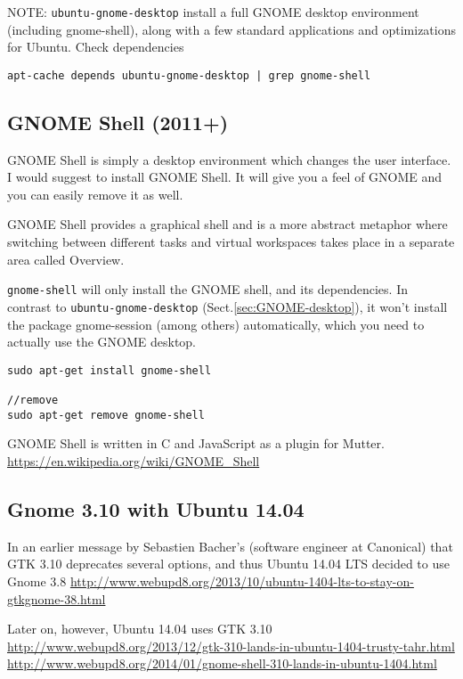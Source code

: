 NOTE: \verb!ubuntu-gnome-desktop! install a full GNOME desktop environment
(including gnome-shell), along with a few standard applications and
optimizations for Ubuntu. Check dependencies
\begin{verbatim}
apt-cache depends ubuntu-gnome-desktop | grep gnome-shell
\end{verbatim}


\subsection{GNOME Shell (2011+)}
\label{sec:GNOME-Shell}

GNOME Shell is simply a desktop environment which changes the user interface.
I would suggest to install GNOME Shell. It will give you a feel of GNOME and you
can easily remove it as well.

GNOME Shell provides a graphical shell and is a more abstract metaphor where
switching between different tasks and virtual workspaces takes place in a
separate area called Overview.

\verb!gnome-shell! will only install the GNOME shell, and its dependencies. In
contrast to \verb!ubuntu-gnome-desktop! (Sect.\ref{sec:GNOME-desktop}), it won't
install the package gnome-session (among others) automatically, which you need
to actually use the GNOME desktop.
\begin{verbatim}
sudo apt-get install gnome-shell

//remove
sudo apt-get remove gnome-shell
\end{verbatim}
GNOME Shell is written in C and JavaScript as a plugin for Mutter.
\url{https://en.wikipedia.org/wiki/GNOME_Shell}


\subsection{Gnome 3.10 with Ubuntu 14.04}
\label{sec:GNOME-3.10}

In an earlier message by Sebastien Bacher's (software engineer at Canonical)
that GTK 3.10 deprecates several options, and thus Ubuntu 14.04 LTS decided to
use Gnome 3.8
\url{http://www.webupd8.org/2013/10/ubuntu-1404-lts-to-stay-on-gtkgnome-38.html}

Later on, however, Ubuntu 14.04 uses GTK 3.10
\url{http://www.webupd8.org/2013/12/gtk-310-lands-in-ubuntu-1404-trusty-tahr.html}
\url{http://www.webupd8.org/2014/01/gnome-shell-310-lands-in-ubuntu-1404.html}

